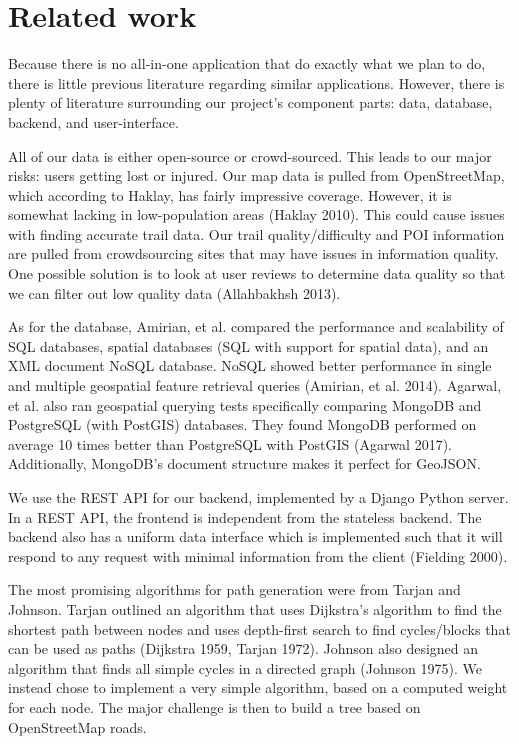 \documentclass[sigconf]{acmart}
\begin{document}
\section{Related work}
Because there is no all-in-one application that do exactly what we plan to do, there is little previous literature regarding similar applications. However, there is plenty of literature surrounding our project's component parts: data, database, backend, and user-interface.

All of our data is either open-source or crowd-sourced. This leads to our major risks: users getting lost or injured. Our map data is pulled from OpenStreetMap, which according to Haklay, has fairly impressive coverage. However, it is somewhat lacking in low-population areas (Haklay 2010). This could cause issues with finding accurate trail data. Our trail quality/difficulty and POI information are pulled from crowdsourcing sites that may have issues in information quality. One possible solution is to look at user reviews to determine data quality so that we can filter out low quality data (Allahbakhsh 2013).

As for the database, Amirian, et al. compared the performance and scalability of SQL databases, spatial databases (SQL with support for spatial data), and an XML document NoSQL database. NoSQL showed better performance in single and multiple geospatial feature retrieval queries (Amirian, et al. 2014). Agarwal, et al. also ran geospatial querying tests specifically comparing MongoDB and PostgreSQL (with PostGIS) databases. They found MongoDB performed on average 10 times better than PostgreSQL with PostGIS (Agarwal 2017). Additionally, MongoDB's document structure makes it perfect for GeoJSON.

We use the REST API for our backend, implemented by a Django Python server. In a REST API, the frontend is independent from the stateless backend. The backend also has a uniform data interface which is implemented such that it will respond to any request with minimal information from the client (Fielding 2000).

The most promising algorithms for path generation were from Tarjan and Johnson. Tarjan outlined an algorithm that uses Dijkstra's algorithm to find the shortest path between nodes and uses depth-first search to find cycles/blocks that can be used as paths (Dijkstra 1959, Tarjan 1972). Johnson also designed an algorithm that finds all simple cycles in a directed graph (Johnson 1975). We instead chose to implement a very simple algorithm, based on a computed weight for each node. The major challenge is then to build a tree based on OpenStreetMap roads.
\end{document}
